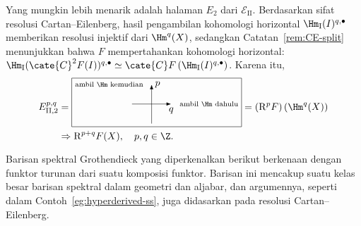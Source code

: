 \begin{example}
	Yang mungkin lebih menarik adalah halaman $E_2$ dari
	$\mathscr{E}_{\mathrm{II}}$. Berdasarkan sifat resolusi Cartan--Eilenberg,
	hasil pengambilan kohomologi horizontal
	$\Hm_{\mathrm{I}}(I)^{q,\bullet}$ memberikan resolusi injektif dari
	$\Hm^q(X)$, sedangkan Catatan~\ref{rem:CE-split} menunjukkan bahwa $F$
	mempertahankan kohomologi horizontal:
	$\Hm_{\mathrm{I}}(\cate{C}^2F(I))^{q,\bullet}
	\simeq\cate{C}F\left(\Hm_{\mathrm{I}}(I)^{q,\bullet}\right)$. Karena itu,
	\begin{align*}
		E_{\mathrm{II},2}^{p, q} & =
		\begin{tikzpicture}[scale=0.7, baseline=(O)]
			\draw[-Latex] (0, -1) -- (0, 1) node[right] {$p$} node[left=0.5em] {\scriptsize\text{ambil $\Hm$ kemudian}};
			\draw[-Latex] (-1, 0) -- (1, 0) node[below] {$q$} node[right=0.5em] {\scriptsize\text{ambil $\Hm$ dahulu}};
			\coordinate (O) at (0, -0.3);
			\draw (current bounding box.north west) rectangle ([yshift=-1ex] current bounding box.south east);
		\end{tikzpicture}
		= (\mathrm{R}^p F)\left( \Hm^q(X)\right) \\
		& \Rightarrow \mathrm{R}^{p+q}F(X) , \quad p, q \in \Z.
	\end{align*}
\end{example}

Barisan spektral Grothendieck yang diperkenalkan berikut berkenaan dengan
funktor turunan dari suatu komposisi funktor. Barisan ini mencakup suatu kelas
besar barisan spektral dalam
geometri dan aljabar, dan argumennya, seperti dalam
Contoh~\ref{eg:hyperderived-ss}, juga didasarkan pada resolusi
Cartan--Eilenberg.

